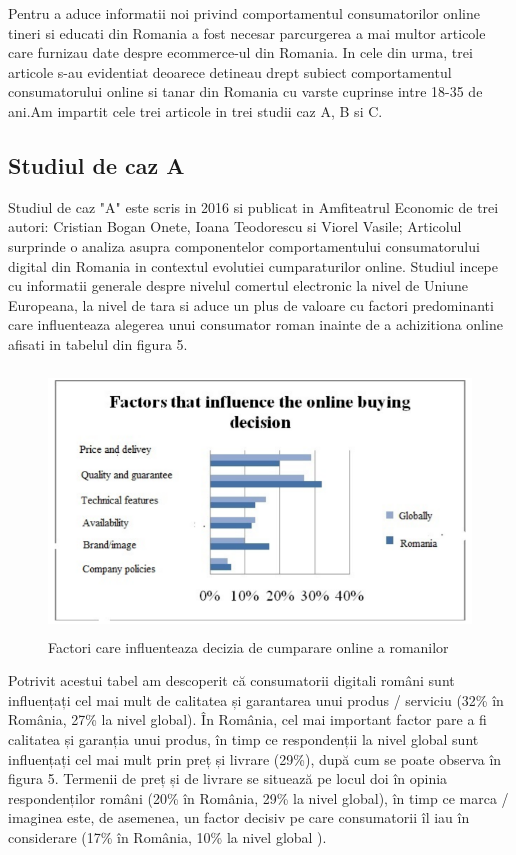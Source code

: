 \documentclass[a4paper, 12pt]{article}
\begin{document}
 \qquad Pentru a aduce informatii noi privind comportamentul consumatorilor online tineri si educati din Romania a fost necesar parcurgerea a mai multor articole care furnizau date despre ecommerce-ul din Romania. In cele din urma, trei articole s-au evidentiat deoarece detineau drept subiect comportamentul consumatorului online si tanar din Romania cu varste cuprinse intre 18-35 de ani.Am impartit cele trei articole in trei studii caz A, B si C.
 \subsection{Studiul de caz A}
 Studiul de caz "A" este scris in 2016 si publicat in Amfiteatrul Economic  de trei autori: Cristian Bogan Onete, Ioana Teodorescu si Viorel Vasile; Articolul surprinde o analiza asupra componentelor comportamentului consumatorului digital din Romania in contextul evolutiei cumparaturilor online. Studiul incepe cu informatii generale despre nivelul comertul electronic la nivel de Uniune Europeana, la nivel de tara si aduce un plus de valoare cu  factori predominanti care influenteaza alegerea unui consumator roman inainte de a achizitiona online afisati in tabelul din figura 5.
 	\begin{figure}[!htb]
 	\centering
 	\includegraphics[width=12cm, height=7cm]{"figures/fifth.png"}
 	\caption{Factori care influenteaza decizia de cumparare online a romanilor}\label{fig:fifth}
 \end{figure}

		\quad  Potrivit acestui tabel am descoperit că consumatorii digitali români sunt influențați cel mai mult de calitatea și garantarea unui produs / serviciu (32\% în România, 27\% la nivel global). În România, cel mai important factor pare a fi calitatea și garanția unui produs, în timp ce respondenții la nivel global sunt influențați cel mai mult prin preț și livrare (29\%), după cum se poate observa în figura 5. Termenii de preț și de livrare se situează pe locul doi în opinia respondenților români (20\% în România, 29\% la nivel global), în timp ce marca / imaginea este, de asemenea, un factor decisiv pe care consumatorii îl iau în considerare (17\% în România, 10\% la nivel global ).
		
\end{document}
